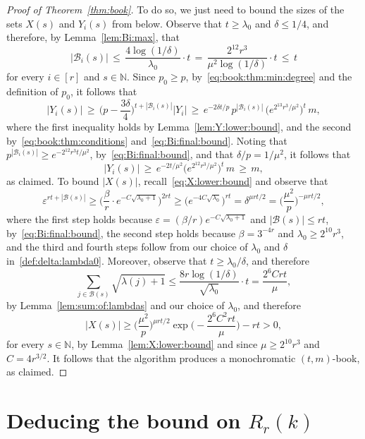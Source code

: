 \documentclass[12pt,reqno]{amsart}
\theoremstyle{definition}
\theoremstyle{remark}
\newcommand\N{\mathbb{N}}
\newcommand\cB{\mathcal{B}}
\newcommand\eps{\varepsilon}
\renewcommand{\le}{\leqslant}
\renewcommand{\ge}{\geqslant}
\def\eps{\varepsilon}
\def\N{\mathbb{N}}
\def\cB{\mathcal{B}}
\begin{document}
\begin{proof}[Proof of Theorem~\ref{thm:book}]
To do so, we just need to bound the sizes of the sets $X(s)$ and $Y_i(s)$ from below. Observe that $t \ge \lambda_0$ and $\delta \le 1/4$, and therefore, by Lemma~\ref{lem:Bi:max}, that
\begin{equation}\label{eq:Bi:final:bound}
|\cB_i(s)| \, \le \, \frac{4 \log(1/\delta)}{\lambda_0} \cdot t \, = \, \frac{2^{12} r^3}{\mu^2 \log(1/\delta)} \cdot t \, \le \, t
\end{equation}
for every $i \in [r]$ and $s \in \N$. Since $p_0 \ge p$, by~\eqref{eq:book:thm:min:degree} and the definition of $p_0$, it follows that  
$$|Y_i(s)| \, \ge \, \bigg( p - \frac{3\delta}{4} \bigg)^{t + |\cB_i(s)|} |Y_i| \, \ge \, e^{-2\delta t / p} \, p^{|\cB_i(s)|} \, \big( e^{2^{13} r^3 / \mu^2} \big)^t \, m,$$
where the first inequality holds by Lemma~\ref{lem:Y:lower:bound}, and the second by~\eqref{eq:book:thm:conditions} and~\eqref{eq:Bi:final:bound}. Noting that $p^{|\cB_i(s)|} \ge e^{-2^{12} r^3 t / \mu^2}$, by~\eqref{eq:Bi:final:bound}, and that $\delta / p = 1/\mu^2$, it follows that 
$$|Y_i(s)| \, \ge \, e^{-2 t / \mu^2} \big( e^{2^{12} r^3 / \mu^2} \big)^t \, m \, \ge \, m,$$
as claimed. To bound $|X(s)|$, recall~\eqref{eq:X:lower:bound} and observe that 
$$\eps^{rt + |\cB(s)|}  \ge \bigg( \frac{\beta}{r} \cdot e^{- C \sqrt{\lambda_0 + 1}} \bigg)^{2rt} \ge \big( e^{- 4C \sqrt{\lambda_0}} \big)^{rt} = \delta^{\mu r t/2} = \bigg( \frac{\mu^2}{p} \bigg)^{-\mu r t / 2},$$
where the first step holds because $\eps = (\beta / r) e^{- C \sqrt{\lambda_0 + 1}}$ and $|\cB(s)| \le rt$, by~\eqref{eq:Bi:final:bound}, the second step holds because $\beta = 3^{-4r}$ and $\lambda_0 \ge 2^{10} r^3$, and the third and fourth steps follow from our choice of $\lambda_0$ and $\delta$ in~\eqref{def:delta:lambda0}. %
Moreover, observe that $t \ge \lambda_0 / \delta$, and therefore
$$\sum_{j \in \cB(s)} \sqrt{\lambda(j)+1} \le \frac{8r \log(1/\delta)}{\sqrt{\lambda_0}} \cdot t = \frac{2^6Crt}{\mu},$$
by Lemma~\ref{lem:sum:of:lambdas} and our choice of $\lambda_0$, and therefore 
$$|X(s)| \ge \bigg( \frac{\mu^2}{p} \bigg)^{\mu r t / 2} \exp\bigg( - \frac{2^6C^2rt}{\mu} \bigg) - rt > 0,$$
for every $s \in \N$, by Lemma~\ref{lem:X:lower:bound} and since $\mu \ge 2^{10} r^3$ and $C = 4r^{3/2}$. It follows that the algorithm produces a monochromatic $(t,m)$-book, as claimed. 
\end{proof}



\section{Deducing the bound on $R_r(k)$}\label{sec:final:proof}
\end{document}
